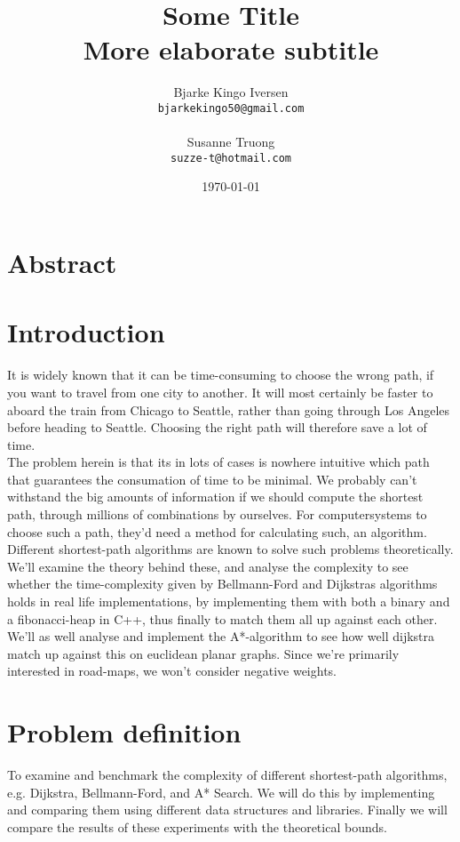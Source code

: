 \documentclass[11pt]{article}
\title{
  \vspace{3cm}
  \Huge{Some Title} \\
  \Large{More elaborate subtitle}
}
\author{
  \Large{Bjarke Kingo Iversen}
  \\ \texttt{bjarkekingo50@gmail.com} \\\\
  \Large{Susanne Truong}
  \\ \texttt{suzze-t@hotmail.com}
}
\date{
    \today
}
\def \ColourPDF {include/ku-farve}
\def \TitlePDF   {include/ku-en}  %
\begin{document}


\clearpage\maketitle
\thispagestyle{empty}

\newpage

\section{Abstract}
\newpage
\tableofcontents
\newpage
\section{Introduction}
It is widely known that it can be time-consuming to choose the wrong path, if you want to travel from one city to another. It will most certainly be faster to aboard the train from Chicago to Seattle, rather than going through Los Angeles before heading to Seattle. Choosing the right path will therefore save a lot of time.\\
The problem herein is that its in lots of cases is nowhere intuitive which path that guarantees the consumation of time to be minimal. We probably can't withstand the big amounts of information if we should compute the shortest path, through millions of combinations by ourselves. For computersystems to choose such a path, they'd need a method for calculating such, an algorithm.\\
Different shortest-path algorithms are known to solve such problems theoretically. We'll examine the theory behind these, and analyse the complexity to see whether the time-complexity given by Bellmann-Ford and Dijkstras algorithms holds in real life implementations, by implementing them with both a binary and a fibonacci-heap in C++, thus finally to match them all up against each other.\\
We'll as well analyse and implement the A*-algorithm to see how well dijkstra match up against this on euclidean planar graphs. Since we're primarily interested in road-maps, we won't consider negative weights.\\

\section{Problem definition}
To examine and benchmark the complexity of different shortest-path algorithms, e.g. Dijkstra, Bellmann-Ford, and A* Search. We will do this by implementing and comparing them using different data structures and libraries. Finally we will compare the results of these experiments with the theoretical bounds.
\end{document}
